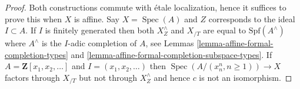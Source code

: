 \documentclass{stacks-project}
\theoremstyle{plain}
\theoremstyle{definition}
\theoremstyle{remark}
\numberwithin{equation}{subsection}
\def\Spec{\mathop{\mathrm{Spec}}}
\begin{document}
\begin{proof}
Both constructions commute with \'etale localization, hence it suffices
to prove this when $X$ is affine. Say $X = \Spec(A)$ and $Z$ corresponds
to the ideal $I \subset A$. If $I$ is finitely generated then both
$X^\wedge_Z$ and $X_{/T}$ are equal to $\text{Spf}(A^\wedge)$ where $A^\wedge$
is the $I$-adic completion of $A$, see
Lemmas \ref{lemma-affine-formal-completion-types} and
\ref{lemma-affine-formal-completion-subspace-types}.
If $A = \mathbf{Z}[x_1, x_2, \ldots]$ and $I = (x_1, x_2, \ldots)$
then $\Spec(A/(x_n^n, n \geq 1)) \to X$ factors through $X_{/T}$
but not through $X^\wedge_Z$ and hence $c$ is not an isomorphism.
\end{proof}










\end{document}
